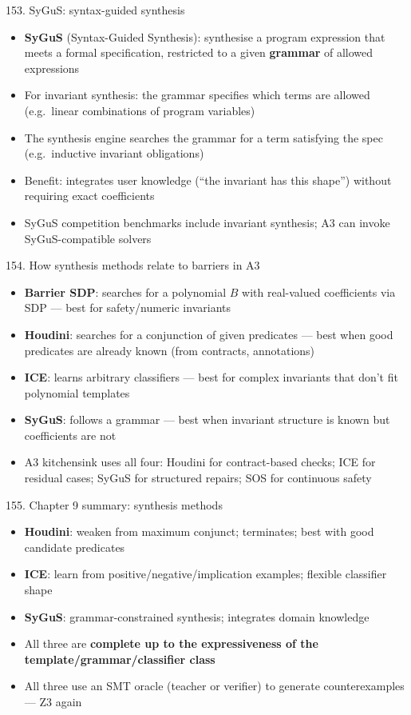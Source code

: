 \documentclass[aspectratio=169]{beamer}
\begin{document}
\begin{frame}{153. SyGuS: syntax-guided synthesis}
\begin{itemize}
  \item \textbf{SyGuS} (Syntax-Guided Synthesis): synthesise a program expression that meets a formal specification, restricted to a given \textbf{grammar} of allowed expressions
  \item For invariant synthesis: the grammar specifies which terms are allowed (e.g.\ linear combinations of program variables)
  \item The synthesis engine searches the grammar for a term satisfying the spec (e.g.\ inductive invariant obligations)
  \item Benefit: integrates user knowledge (``the invariant has this shape'') without requiring exact coefficients
  \item SyGuS competition benchmarks include invariant synthesis; A3 can invoke SyGuS-compatible solvers
\end{itemize}
\end{frame}

\begin{frame}{154. How synthesis methods relate to barriers in A3}
\begin{itemize}
  \item \textbf{Barrier SDP}: searches for a polynomial $B$ with real-valued coefficients via SDP --- best for safety/numeric invariants
  \item \textbf{Houdini}: searches for a conjunction of given predicates --- best when good predicates are already known (from contracts, annotations)
  \item \textbf{ICE}: learns arbitrary classifiers --- best for complex invariants that don't fit polynomial templates
  \item \textbf{SyGuS}: follows a grammar --- best when invariant structure is known but coefficients are not
  \item A3 kitchensink uses all four: Houdini for contract-based checks; ICE for residual cases; SyGuS for structured repairs; SOS for continuous safety
\end{itemize}
\end{frame}

\begin{frame}{155. Chapter 9 summary: synthesis methods}
\begin{itemize}
  \item \textbf{Houdini}: weaken from maximum conjunct; terminates; best with good candidate predicates
  \item \textbf{ICE}: learn from positive/negative/implication examples; flexible classifier shape
  \item \textbf{SyGuS}: grammar-constrained synthesis; integrates domain knowledge
  \item All three are \textbf{complete up to the expressiveness of the template/grammar/classifier class}
  \item All three use an SMT oracle (teacher or verifier) to generate counterexamples --- Z3 again
\end{itemize}
\end{frame}
\end{document}
